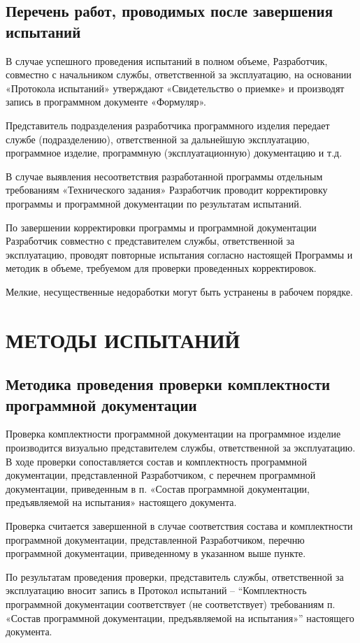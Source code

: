 \documentclass[14pt,a4paper,final]{extreport}
\begin{document}
\section{Перечень работ, проводимых после завершения испытаний}
В случае успешного проведения испытаний в полном объеме, Разработчик, совместно с начальником службы, ответственной за эксплуатацию, на основании «Протокола испытаний» утверждают «Свидетельство о приемке» и производят запись в программном документе «Формуляр».

Представитель подразделения разработчика программного изделия передает службе (подразделению), ответственной за дальнейшую эксплуатацию, программное изделие, программную (эксплуатационную) документацию и т.д.

В случае выявления несоответствия разработанной программы отдельным требованиям «Технического задания» Разработчик проводит корректировку программы и программной документации по результатам испытаний.

По завершении корректировки программы и программной документации Разработчик совместно с представителем службы, ответственной за эксплуатацию, проводят повторные испытания согласно настоящей Программы и методик в объеме, требуемом для проверки
проведенных корректировок.
  
Мелкие, несущественные недоработки могут быть устранены в рабочем порядке.

\chapter{МЕТОДЫ ИСПЫТАНИЙ}
\section{Методика проведения проверки комплектности программной документации}
Проверка комплектности программной документации на программное изделие производится визуально представителем службы, ответственной за эксплуатацию. В ходе проверки сопоставляется состав и комплектность программной документации, представленной Разработчиком, с перечнем программной документации, приведенным в п. «Состав программной документации, предъявляемой на испытания» настоящего документа.

Проверка считается завершенной в случае соответствия состава и комплектности программной документации, представленной Разработчиком, перечню программной документации, приведенному в указанном выше пункте.

По результатам проведения проверки, представитель службы, ответственной за эксплуатацию вносит запись в Протокол испытаний – “Комплектность программной документации соответствует (не соответствует) требованиям п. «Состав программной документации, предъявляемой на испытания»” настоящего документа.
\end{document}

